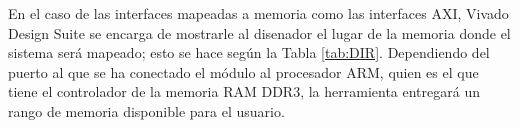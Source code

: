En el caso de las interfaces mapeadas a memoria como las interfaces AXI, Vivado Design Suite se encarga de mostrarle al disenador el lugar de la memoria donde el sistema será mapeado; esto se hace según la Tabla \ref{tab:DIR}. Dependiendo del puerto al que se ha conectado el módulo al procesador ARM, quien es el que tiene el controlador de la memoria RAM DDR3, la herramienta entregará un rango de memoria disponible para el usuario.


